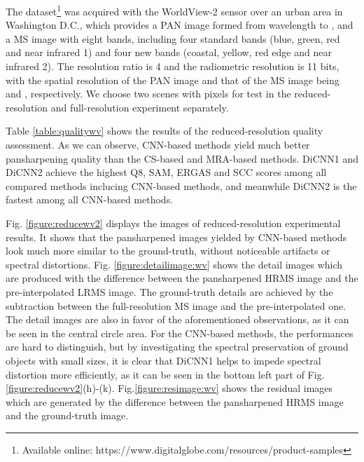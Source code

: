 \documentclass[journal]{IEEEtran}
\begin{document}
The dataset\footnote{Available online: https://www.digitalglobe.com/resources/product-samples} was acquired with the WorldView-2 sensor over an urban area in Washington D.C., which provides a PAN image formed from wavelength  to , and a MS image with eight bands, including four standard bands (blue, green, red and near infrared 1) and four new bands (coastal, yellow, red edge and near infrared 2). The resolution ratio  is 4 and the radiometric resolution is 11 bits, with the spatial resolution of the PAN image and that of the MS image being  and , respectively. We choose two scenes with  pixels for test in the reduced-resolution and full-resolution experiment separately.

Table \ref{table:qualitywv} shows the results of the reduced-resolution quality assessment. As we can observe, CNN-based methods yield much better pansharpening quality than the CS-based and MRA-based methods. DiCNN1 and DiCNN2 achieve the highest Q8, SAM, ERGAS and SCC scores among all compared methods inclucing CNN-based methods, and meanwhile DiCNN2 is the fastest among all CNN-based methods.

Fig. \ref{figure:reducewv2} displays the images of reduced-resolution experimental results. It shows that the pansharpened images yielded by CNN-based methods look much more similar to the ground-truth, without noticeable artifacts or spectral distortions. Fig. \ref{figure:detailimage:wv} shows the detail images which are produced with the difference between the pansharpened HRMS image and the pre-interpolated LRMS image. The ground-truth details are achieved by the subtraction between the full-resolution MS image and the pre-interpolated one. The detail images are also in favor of the aforementioned observations, as it can be seen in the central circle area. For the CNN-based methods, the performances are hard to distinguish, but by investigating the spectral preservation of ground objects with small sizes, it is clear that DiCNN1 helps to impede spectral distortion more efficiently, as it can be seen in the bottom left part of Fig. \ref{figure:reducewv2}(h)-(k). Fig.\ref{figure:resimage:wv} shows the residual images which are generated by the difference between the pansharpened HRMS image and the ground-truth image.
\end{document}
